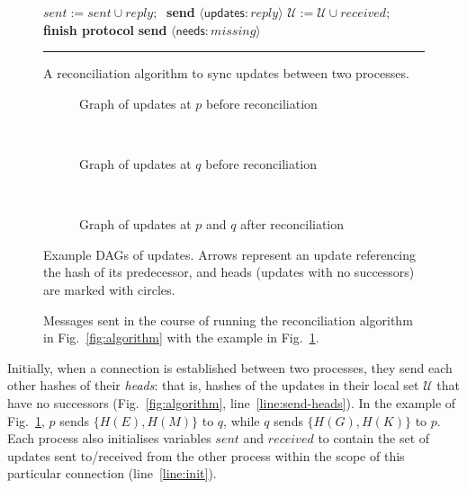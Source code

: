 \documentclass[manuscript,anonymous]{acmart}
\begin{document}
\begin{figure}[p]
\begin{minipage}{0.57\linewidth}
\begin{algorithmic}[1]
        \State $\mathit{sent} := \mathit{sent} \cup \mathit{reply};\;$ \textbf{send} $\langle\mathsf{updates}: \mathit{reply}\rangle$ \label{line:send-updates}
    \EndOn\vspace{6pt} \label{line:end-needs}
         \label{line:missing-empty}
            \State $\mathcal{U} := \mathcal{U} \cup \mathit{received};\;$ \textbf{finish protocol} \label{line:finish}
        \Else
            \State \textbf{send} $\langle\mathsf{needs}: \mathit{missing}\rangle$ \label{line:send-missing}
        \EndIf
    \EndFunction
    \end{algorithmic}
    \vspace{4pt}\hrule
    \caption{A reconciliation algorithm to sync updates between two processes.}\label{fig:algorithm}
\end{minipage}\hfill
\begin{minipage}{0.38\linewidth}
    \begin{subfigure}{\textwidth}
    
    \caption{Graph of updates at $p$ before reconciliation}
    \end{subfigure}\\[35pt]
    \begin{subfigure}{\textwidth}
    
    \caption{Graph of updates at $q$ before reconciliation}
    \end{subfigure}\\[35pt]
    \begin{subfigure}{\textwidth}
    
    \caption{Graph of updates at $p$ and $q$ after reconciliation}
    \end{subfigure}
    \caption{Example DAGs of updates. Arrows represent an update referencing the hash of its predecessor, and heads (updates with no successors) are marked with circles.}
    \label{fig:example-dags}
\end{minipage}
\end{figure}

\begin{figure}[p]
    \centering
    
    \caption{Messages sent in the course of running the reconciliation algorithm in Fig.~\ref{fig:algorithm} with the example in Fig.~\ref{fig:example-dags}.}
    \label{fig:messages}
\end{figure}

Initially, when a connection is established between two processes, they send each other hashes of their \emph{heads}: that is, hashes of the updates in their local set $\mathcal{U}$ that have no successors (Fig.~\ref{fig:algorithm}, line~\ref{line:send-heads}).
In the example of Fig.~\ref{fig:example-dags}, $p$ sends $\{H(E),H(M)\}$ to $q$, while $q$ sends $\{H(G),H(K)\}$ to $p$.
Each process also initialises variables $\mathit{sent}$ and $\mathit{received}$ to contain the set of updates sent to/received from the other process within the scope of this particular connection (line~\ref{line:init}).
\end{document}
